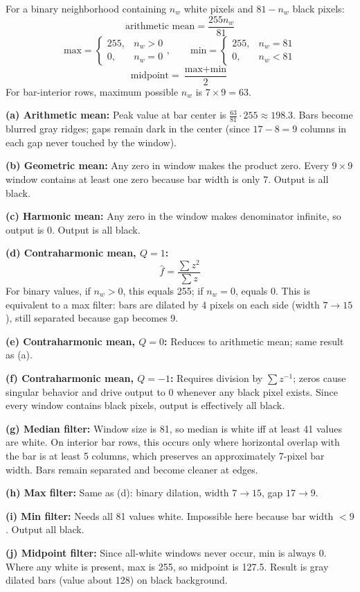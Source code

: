 \documentclass[12pt]{article}
\begin{document}
\begin{stepbox}
For a binary neighborhood containing $n_w$ white pixels and $81-n_w$ black pixels:
\[
\text{arithmetic mean} = \frac{255n_w}{81}
\]
\[
\text{max} = \begin{cases}255,&n_w>0\\0,&n_w=0\end{cases},\qquad
\text{min} = \begin{cases}255,&n_w=81\\0,&n_w<81\end{cases}
\]
\[
\text{midpoint} = \frac{\text{max}+\text{min}}{2}
\]
For bar-interior rows, maximum possible $n_w$ is $7\times 9=63$.
\end{stepbox}

\begin{stepbox}
\textbf{(a) Arithmetic mean:}
Peak value at bar center is $\frac{63}{81}\cdot255\approx198.3$. Bars become blurred gray ridges; gaps remain dark in the center (since $17-8=9$ columns in each gap never touched by the window).

\textbf{(b) Geometric mean:}
Any zero in window makes the product zero. Every $9\times 9$ window contains at least one zero because bar width is only 7. Output is all black.

\textbf{(c) Harmonic mean:}
Any zero in the window makes denominator infinite, so output is 0. Output is all black.

\textbf{(d) Contraharmonic mean, $Q=1$:}
\[
\hat f = \frac{\sum z^2}{\sum z}
\]
For binary values, if $n_w>0$, this equals 255; if $n_w=0$, equals 0. This is equivalent to a max filter: bars are dilated by 4 pixels on each side (width $7\to15$), still separated because gap becomes 9.

\textbf{(e) Contraharmonic mean, $Q=0$:}
Reduces to arithmetic mean; same result as (a).

\textbf{(f) Contraharmonic mean, $Q=-1$:}
Requires division by $\sum z^{-1}$; zeros cause singular behavior and drive output to 0 whenever any black pixel exists. Since every window contains black pixels, output is effectively all black.

\textbf{(g) Median filter:}
Window size is 81, so median is white iff at least 41 values are white. On interior bar rows, this occurs only where horizontal overlap with the bar is at least 5 columns, which preserves an approximately 7-pixel bar width. Bars remain separated and become cleaner at edges.

\textbf{(h) Max filter:}
Same as (d): binary dilation, width $7\to15$, gap $17\to9$.

\textbf{(i) Min filter:}
Needs all 81 values white. Impossible here because bar width $<9$. Output all black.

\textbf{(j) Midpoint filter:}
Since all-white windows never occur, min is always 0. Where any white is present, max is 255, so midpoint is 127.5. Result is gray dilated bars (value about 128) on black background.
\end{stepbox}
\end{document}
